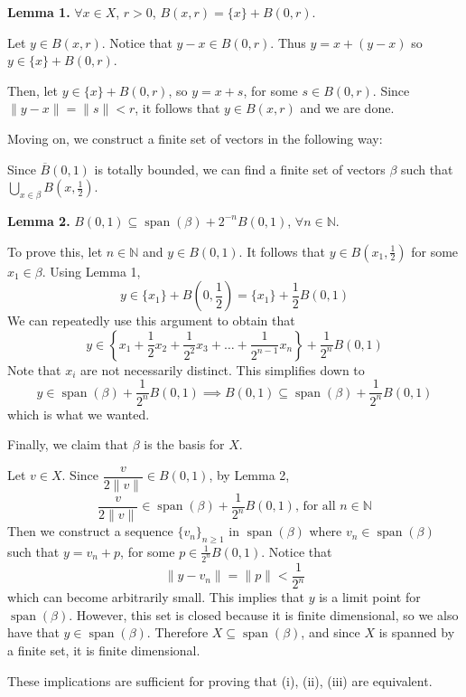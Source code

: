 \documentclass{article}
\newcommand{\cl}[1]{\overline{#1}}
\theoremstyle{plain} %
\numberwithin{thm}{section} %
\theoremstyle{definition}
\begin{document}
\begin{question}{24}
        \textbf{Lemma 1.} \(\forall x \in X\), \(r > 0\), \(B(x,r) = \{x\} + B(0,r)\).

        Let \(y \in B(x,r)\). Notice that \(y-x \in B(0,r)\). Thus \(y = x + (y-x)\) so \(y \in \{x\} + B(0,r)\).

        Then, let \(y \in \{x\} + B(0,r)\), so \(y = x + s\), for some \(s \in B(0,r)\). Since \(\|y-x\| = \|s\| < r\), it follows that \(y \in B(x,r)\) and we are done.
        
        Moving on, we construct a finite set of vectors in the following way:

        Since \(\cl{B}(0,1)\) is totally bounded, we can find a finite set of vectors \(\beta\) such that \(\bigcup_{x \in \beta} B\left(x,\frac{1}{2}\right)\).

        \textbf{Lemma 2.} \(B(0,1) \subseteq \operatorname{span}(\beta) + 2^{-n} B(0,1)\), \(\forall n \in \mathbb{N}\).

        To prove this, let \(n \in \mathbb{N}\) and \(y \in B(0,1)\). It follows that \(y \in B(x_1, \frac{1}{2})\) for some \(x_1 \in \beta\). Using Lemma 1,
        \[
            y \in \{x_1\} + B\left(0,\frac{1}{2}\right) = \{x_1\} + \frac{1}{2}B(0,1)
        \]
        We can repeatedly use this argument to obtain that
        \[
            y \in \left\{x_1 + \frac{1}{2}x_2 + \frac{1}{2^2}x_3 + \dots + \frac{1}{2^{n-1}}x_n\right\} + \frac{1}{2^n}B(0,1)
        \]
        Note that \(x_i\) are not necessarily distinct. This simplifies down to
        \[
            y \in \operatorname{span}(\beta) + \frac{1}{2^n}B(0,1) \implies B(0,1) \subseteq \operatorname{span}(\beta) + \frac{1}{2^n}B(0,1)
        \]
        which is what we wanted.

        Finally, we claim that \(\beta\) is the basis for \(X\).

        Let \(v \in X\). Since \(\dfrac{v}{2\|v\|} \in B(0,1)\), by Lemma 2,
        \[
            \frac{v}{2\|v\|} \in \operatorname{span}(\beta) + \frac{1}{2^n}B(0,1) \text{, for all } n \in \mathbb{N}
        \]
        Then we construct a sequence \(\{v_n\}_{n\geq 1}\) in \(\operatorname{span}(\beta)\) where \(v_n \in \operatorname{span}(\beta)\) such that \(y = v_n + p\), for some \(p \in \frac{1}{2^n}B(0,1)\). Notice that
        \[
            \|y - v_n\| = \|p\| < \frac{1}{2^n}
        \]
        which can become arbitrarily small. This implies that \(y\) is a limit point for \(\operatorname{span}(\beta)\). However, this set is closed because it is finite dimensional, so we also have that \(y \in \operatorname{span}(\beta)\). Therefore \(X \subseteq \operatorname{span}(\beta)\), and since \(X\) is spanned by a finite set, it is finite dimensional.

        These implications are sufficient for proving that (i), (ii), (iii) are equivalent.
    \end{question}
    
\end{document}
